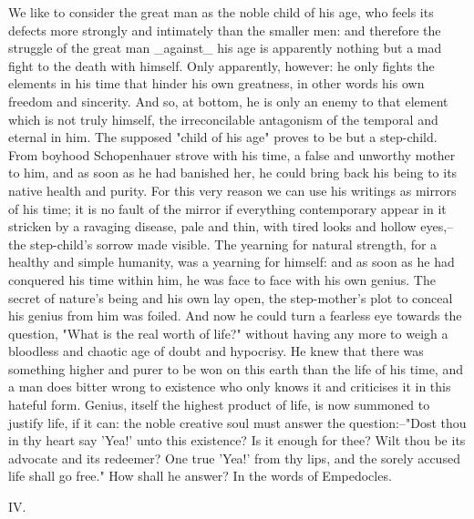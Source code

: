 We like to consider the great man as the noble child of his age, who
feels its defects more strongly and intimately than the smaller men:
and therefore the struggle of the great man _against_ his age is
apparently nothing but a mad fight to the death with himself. Only
apparently, however: he only fights the elements in his time that
hinder his own greatness, in other words his own freedom and
sincerity. And so, at bottom, he is only an enemy to that element
which is not truly himself, the irreconcilable antagonism of the
temporal and eternal in him. The supposed "child of his age" proves
to be but a step-child. From boyhood Schopenhauer strove with his
time, a false and unworthy mother to him, and as soon as he had
banished her, he could bring back his being to its native health and
purity. For this very reason we can use his writings as mirrors of
his time; it is no fault of the mirror if everything contemporary
appear in it stricken by a ravaging disease, pale and thin, with
tired looks and hollow eyes,--the step-child's sorrow made visible.
The yearning for natural strength, for a healthy and simple humanity,
was a yearning for himself: and as soon as he had conquered his time
within him, he was face to face with his own genius. The secret of
nature's being and his own lay open, the step-mother's plot to
conceal his genius from him was foiled. And now he could turn a
fearless eye towards the question, "What is the real worth of life?"
without having any more to weigh a bloodless and chaotic age of doubt
and hypocrisy. He knew that there was something higher and purer to
be won on this earth than the life of his time, and a man does bitter
wrong to existence who only knows it and criticises it in this
hateful form. Genius, itself the highest product of life, is now
summoned to justify life, if it can: the noble creative soul must
answer the question:--"Dost thou in thy heart say 'Yea!' unto this
existence? Is it enough for thee? Wilt thou be its advocate and its
redeemer? One true 'Yea!' from thy lips, and the sorely accused life
shall go free." How shall he answer? In the words of Empedocles.


IV.

